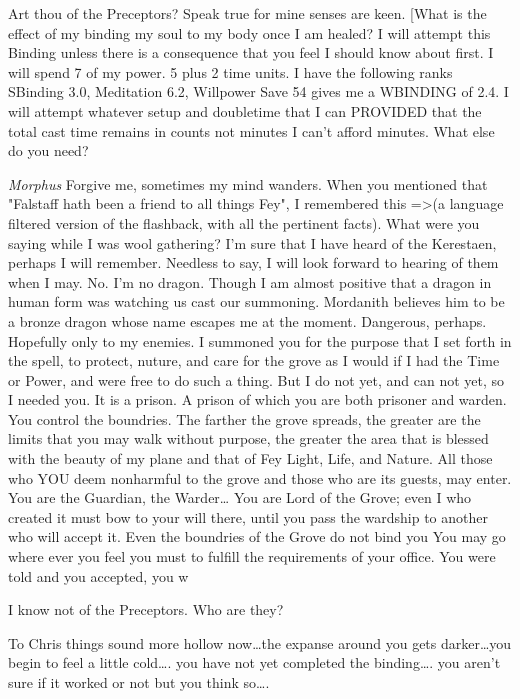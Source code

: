 {Art thou of the Preceptors? Speak true for mine senses are 
keen.
[What is the effect of my binding my soul to my body once I am healed? I 
will attempt this Binding unless there is a consequence that you feel I 
should know about first. I will spend 7 of my power. 5 plus 2 time 
units. I have the following ranks SBinding 3.0, Meditation 6.2, 
Willpower Save 54%
gives me a WBINDING of 2.4. I will attempt whatever setup and doubletime 
that I can PROVIDED that the total cast time remains in counts not 
minutes \- I can't afford minutes. What else do you need?

{\em Morphus}
			Forgive me, sometimes my mind wanders. When you mentioned 
that "Falstaff hath been a friend to all things Fey", I remembered 
this =>(a language filtered version of the flashback, with all the 
pertinent facts). What were you saying while I was wool gathering?
I'm sure that I have heard of the Kerestaen, perhaps I will remember. 
Needless to say, I will look forward to hearing of them when I may.
No. I'm no dragon. Though I am almost positive that a dragon in human 
form was watching us cast our summoning. Mordanith believes him to be a 
bronze dragon whose name escapes me at the moment.
Dangerous, perhaps. Hopefully only to my enemies. I summoned you for the 
purpose that I set forth in the spell, to protect, nuture, and care for 
the grove as I would if I had the Time or Power, and were free to do 
such a thing. But I do not yet, and can not yet, so I needed you. It is 
a prison. A prison of which you are both prisoner and warden. You 
control the boundries. The farther the grove spreads, the greater are 
the limits that you may walk without purpose, the greater the area that 
is blessed with the beauty of my plane and that of Fey Light, Life, and 
Nature. All those who YOU deem non\-harmful to the grove and those who 
are its guests, may enter. You are the Guardian, the Warder\dots
You are  Lord of the Grove; even I who created it must bow to your will there, 
until you pass the wardship to another who will accept it.  Even the 
boundries of the Grove do not bind you You may go where ever you feel 
you must to fulfill the requirements of your office. You were told and 
you accepted, you w

I know not of the Preceptors. Who are they?

{To Chris things sound more hollow now\dots the expanse around you gets 
darker\dots you begin to feel a little cold\dots. you have not yet 
completed the binding\dots. you aren't sure if it worked or not but you 
think so\dots.}

}
